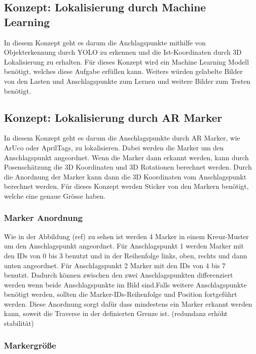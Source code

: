 \subsection{Konzept: Lokalisierung durch Machine Learning}

In diesem Konzept geht es darum die Anchlagspunkte mithilfe von Objekterkennung durch YOLO zu erkennen und die Ist-Koordinaten durch 3D Lokalisierung zu erhalten. 
Für dieses Konzept wird ein Machine Learning Modell benötigt, welches diese Aufgabe erfüllen kann. 
Weiters würden gelabelte Bilder von den Lasten und Anschlagspunkte zum Lernen und weitere Bilder zum Testen benötigt.

\subsection{Konzept: Lokalisierung durch AR Marker}

In diesem Konzept geht es darum die Anschlagspunkte durch AR Marker, wie ArUco oder AprilTags, zu lokalisieren. Dabei werden die Marker um den Anschlagspunkt angeordnet. Wenn die Marker dann erkannt werden, kann durch Posenschätzung die 3D Koordinaten und 3D Rotationen berechnet werden. Durch die Anordnung der Marker kann dann die 3D Koordinaten vom Anschlagspunkt berechnet werden. 
Für dieses Konzept werden Sticker von den Markern benötigt, welche eine genaue Grösse haben. 

\subsubsection{Marker Anordnung}

Wie in der Abbildung (ref) zu sehen ist werden 4 Marker in einem Kreuz-Muster um den Anschlagspunkt angeordnet. Für Anschlagspunkt 1 werden Marker mit den IDs von 0 bis 3 benutzt und in der Reihenfolge links, oben, rechts und dann unten angeordnet. Für Anschlagspunkt 2 Marker mit den IDs von 4 bis 7 benutzt. Dadurch können zwischen den zwei Anschlagspunkten differenziert werden wenn beide Anschlagspunkte im Bild sind.Falls weitere Anschlagspunkte benötigt werden, sollten die Marker-IDs-Reihenfolge und Position fortgeführt werden. Diese Anordnung sorgt dafür dass mindestens ein Marker erkannt werden kann, soweit die Traverse in der definierten Grenze ist. 
(redundanz erhöht stabilität)

\clearpage
\subsubsection{Markergröße}

